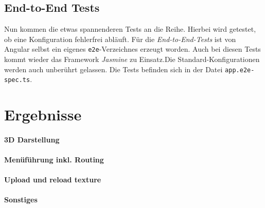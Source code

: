 \subsection{End-to-End Tests}
%
Nun kommen die etwas spannenderen Tests an die Reihe. Hierbei wird getestet, ob eine Konfiguration fehlerfrei abläuft. Für die \textit{End-to-End-Tests} ist von Angular selbst ein eigenes \texttt{e2e}-Verzeichnes erzeugt worden. Auch bei diesen Tests kommt wieder das Framework \textit{Jasmine} zu Einsatz.Die Standard-Konfigurationen werden auch unberührt gelassen. Die Tests befinden sich in der Datei \texttt{app.e2e-spec.ts}.
\section{Ergebnisse}
\paragraph{3D Darstellung}
\paragraph{Menüführung inkl. Routing}
\paragraph{Upload und reload texture}
\paragraph{Sonstiges}